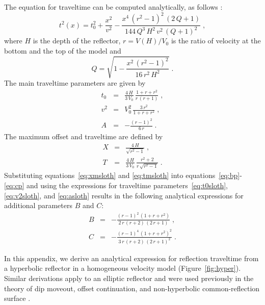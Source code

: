 The equation for traveltime can be computed analytically, as follows
\cite[]{cerveny}:
\begin{equation}
  t^2(x) = t_0^2 + \frac{x^2}{v^2} - 
  \frac{x^4\,(r^2-1)^2\,(2\,Q+1)}{144\,Q^3\,H^2\,v^2\,(Q+1)^2}\;,
\end{equation}
where $H$ is the depth of the reflector, $r=V(H)/V_0$ is the
ratio of velocity at the bottom and the top of the model and
\[
Q = \sqrt{1-\frac{x^2\,(r^2-1)^2}{16\,r^2\,H^2}}\;.
\]
The main traveltime parameters are given by
\begin{eqnarray}
  \label{eq:t0sloth}
  t_0 & = & \frac{4\,H}{3\,V_0}\,\frac{1+r+r^2}{r\,(r+1)}\;, \\
  \label{eq:v2sloth}
  v^2 & = & V_0^2\,\frac{3\,r^2}{1+r+r^2}\;, \\
  \label{eq:asloth}
  A & = & -\frac{(r-1)^2}{6\,r}\;.
\end{eqnarray}
The maximum offset and traveltime are defined by
\begin{eqnarray}
  \label{eq:xmsloth}
  X & = & \frac{4\,H}{\sqrt{r^2-1}}\;, \\
  \label{eq:tmsloth}
  T & = & \frac{4\,H}{3\,V_0}\,\frac{r^2+2}{r\,\sqrt{r^2-1}}\;.
\end{eqnarray}
Substituting equations~\ref{eq:xmsloth} and \ref{eq:tmsloth} into
equations~\ref{eq:bp}-\ref{eq:cp} and using the expressions for
traveltime parameters~\ref{eq:t0sloth}, \ref{eq:v2sloth}, and
\ref{eq:asloth} results in the following analytical expressions for
additional parameters $B$ and $C$:
\begin{eqnarray}
\label{eq:bsloth}
B & = & - \frac{(r-1)^2\,(1+r+r^2)}{2\,r\,(r+2)\,(2\,r+1)}\;, \\
\label{eq:csloth}
C & = & - \frac{(r-1)^4\,(1+r+r^2)^2}{3\,r\,(r+2)\,(2\,r+1)^2}\;.
\end{eqnarray}


In this appendix, we derive an analytical expression for reflection
traveltime from a hyperbolic reflector in a homogeneous velocity
model (Figure~\ref{fig:hyper}). Similar derivations apply to an elliptic reflector and were
used previously in the theory of dip moveout, offset continuation, and
non-hyperbolic common-reflection surface
\cite[]{stovas,GEO68-02-07180732,crs}.


